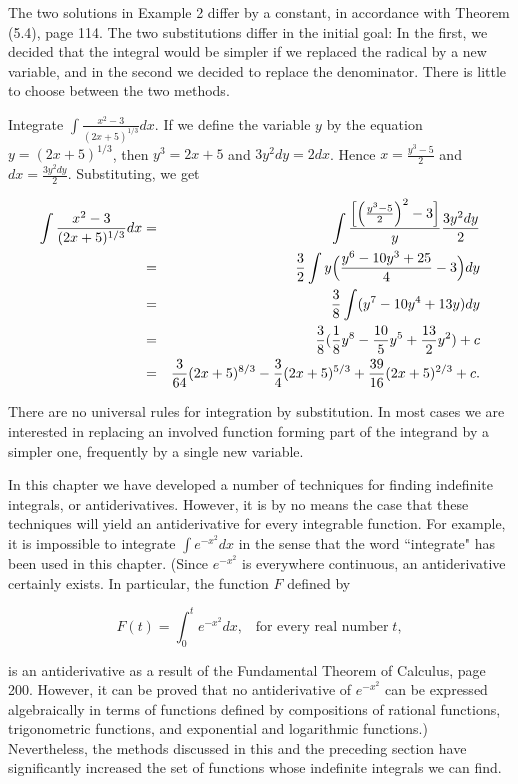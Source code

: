 The two solutions in Example 2 differ by a constant, in accordance with Theorem (5.4), page 114. The two substitutions differ in the initial goal: 
In the first, we decided that the integral would be simpler if we replaced the radical by a new variable, and in the second we decided to replace 
the denominator. There is little to choose between the two methods.

\begin{example}
Integrate $\int \frac{x^2 - 3}{(2x + 5)^{1/3}}dx$. If we define the variable $y$ by the equation $y = (2x + 5)^{1/3}$, then $y^3 = 2x + 5$ and $3y^{2}dy = 2 dx$. Hence $x = \frac{y^3 - 5}{2}$ and $dx = \frac{3y^2 dy}{2}$.  Substituting, we get

\begin{eqnarray*}
\int \frac{x^2 - 3}{(2x + 5)^{1/3}} dx
&=& \int \frac{\Bigl[ \Bigl(\frac{y^3 - 5}{2} \Bigr)^2 - 3 \Bigr]}{y} \frac{3y^{2}dy}{2}\\
&=& \frac{3}{2} \int y \Bigl( \frac{y^6 - 10 y^3 + 25}{4} - 3 \Bigr) dy \\
&=& \frac{3}{8} \int (y^7 - 10 y^4 + 13y)dy \\
&=& \frac{3}{8}(\frac{1}{8}y^8 - \frac{10}{5}y^5 + \frac{13}{2}y^2) + c\\
&=& \frac{3}{64}(2x + 5)^{8/3} - \frac{3}{4}(2x + 5)^{5/3} 
+ \frac{39}{16}(2x + 5)^{2/3} + c.
\end{eqnarray*}
\end{example}

There are no universal rules for integration by substitution. In most cases we are interested in replacing an involved function forming part of the integrand by a simpler one, frequently by a single new variable.

In this chapter we have developed a number of techniques for finding indefinite integrals, or antiderivatives. However, it is by no means the case that these techniques will yield an antiderivative for every integrable function. For example, it is impossible to integrate $\int e^{-x^2} dx$ in the sense that the word ``integrate" has been used in this chapter. (Since $e^{-x^2}$ is everywhere continuous, an antiderivative certainly exists. In particular, the function $F$ defined by

$$
F(t) = \int_0^t e^{-x^2} dx,\;\;\; \mbox{for every real number}\; t,
$$

\noindent is an antiderivative as a result of the Fundamental Theorem of Calculus, page 200. However, it can be proved that no antiderivative of $e^{-x^2}$ can be expressed algebraically in terms of functions defined by compositions of rational functions, trigonometric functions, and
exponential and logarithmic functions.) Nevertheless, the methods discussed in this and the preceding
section have significantly increased the set of functions whose indefinite integrals we can find.

